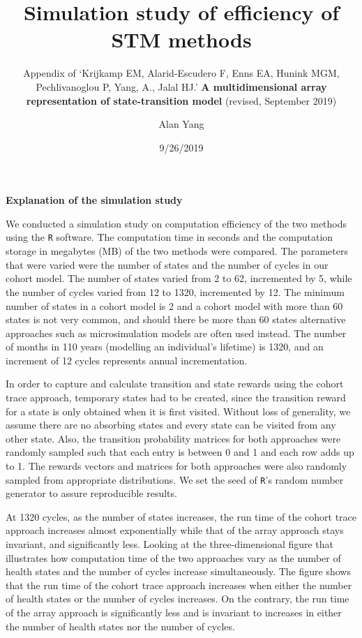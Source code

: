 \documentclass[]{article}
\title{Simulation study of efficiency of STM methods}
\subtitle{Appendix of `Krijkamp EM, Alarid-Escudero F, Enns EA, Hunink MGM,
Pechlivanoglou P, Yang, A., Jalal HJ.' \textbf{A multidimensional array
representation of state-transition model} (revised, September 2019)}
\author{Alan Yang}
\date{9/26/2019}
\begin{document}
\maketitle

\textbf{Explanation of the simulation study}

We conducted a simulation study on computation efficiency of the two
methods using the \texttt{R} software. The computation time in seconds
and the computation storage in megabytes (MB) of the two methods were
compared. The parameters that were varied were the number of states and
the number of cycles in our cohort model. The number of states varied
from 2 to 62, incremented by 5, while the number of cycles varied from
12 to 1320, incremented by 12. The minimum number of states in a cohort
model is 2 and a cohort model with more than 60 states is not very
common, and should there be more than 60 states alternative approaches
such as microsimulation models are often used instead. The number of
months in 110 years (modelling an individual's lifetime) is 1320, and an
increment of 12 cycles represents annual incrementation.

In order to capture and calculate transition and state rewards using the
cohort trace approach, temporary states had to be created, since the
transition reward for a state is only obtained when it is first visited.
Without loss of generality, we assume there are no absorbing states and
every state can be visited from any other state. Also, the transition
probability matrices for both approaches were randomly sampled such that
each entry is between 0 and 1 and each row adds up to 1. The rewards
vectors and matrices for both approaches were also randomly sampled from
appropriate distributions. We set the seed of \texttt{R}'s random number
generator to assure reproducible results.

At 1320 cycles, as the number of states increases, the run time of the
cohort trace approach increases almost exponentially while that of the
array approach stays invariant, and significantly less. Looking at the
three-dimensional figure that illustrates how computation time of the
two approaches vary as the number of health states and the number of
cycles increase simultaneously. The figure shows that the run time of
the cohort trace approach increases when either the number of health
states or the number of cycles increases. On the contrary, the run time
of the array approach is significantly less and is invariant to
increases in either the number of health states nor the number of
cycles.
\end{document}

